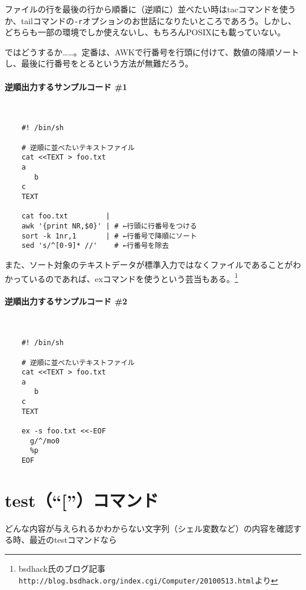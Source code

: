 ファイルの行を最後の行から順番に（逆順に）並べたい時はtacコマンドを使うか、tailコマンドの\verb|-r|オプションのお世話になりたいところであろう。しかし、どちらも一部の環境でしか使えないし、もちろんPOSIXにも載っていない。

ではどうするか……。定番は、AWKで行番号を行頭に付けて、数値の降順ソートし、最後に行番号をとるという方法が無難だろう。

\paragraph{逆順出力するサンプルコード \#1} 　\\
\begin{frameboxit}{160.0mm}
\begin{verbatim}
	#! /bin/sh

	# 逆順に並べたいテキストファイル
	cat <<TEXT > foo.txt
	a
	   b
	c
	TEXT

	cat foo.txt         |
	awk '{print NR,$0}' | # ←行頭に行番号をつける
	sort -k 1nr,1       | # ←行番号で降順にソート
	sed 's/^[0-9]* //'    # ←行番号を除去
\end{verbatim}
\end{frameboxit}

また、ソート対象のテキストデータが標準入力ではなくファイルであることがわかっているのであれば、exコマンドを使うという芸当もある。\footnote{bsdhack氏のブログ記事\verb|http://blog.bsdhack.org/index.cgi/Computer/20100513.html|より}

\paragraph{逆順出力するサンプルコード \#2} 　\\
\begin{frameboxit}{160.0mm}
\begin{verbatim}
	#! /bin/sh

	# 逆順に並べたいテキストファイル
	cat <<TEXT > foo.txt
	a
	   b
	c
	TEXT

	ex -s foo.txt <<-EOF
	  g/^/mo0
	  %p
	EOF
\end{verbatim}
\end{frameboxit}

\section{test（``[''）コマンド}
\label{allenvs:test}

どんな内容が与えられるかわからない文字列（シェル変数など）の内容を確認する時、最近のtestコマンドなら

